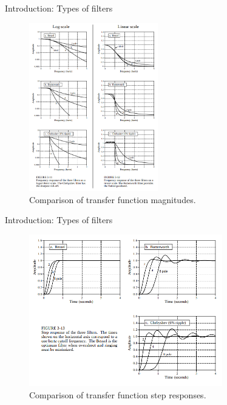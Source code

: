 \documentclass{beamer}
\begin{document}
\begin{frame}{Introduction: Types of filters}
\begin{figure}
\centering
\includegraphics[width=0.5\textwidth]{figures/filters1.png}
\caption{\label{fig:filters1} Comparison of transfer function magnitudes.}
\end{figure}
\end{frame}

\begin{frame}{Introduction: Types of filters}
\begin{figure}
\centering
\includegraphics[width=0.75\textwidth]{figures/filters2.png}
\caption{\label{fig:filters2} Comparison of transfer function step responses.}
\end{figure}
\end{frame}
\end{document}
